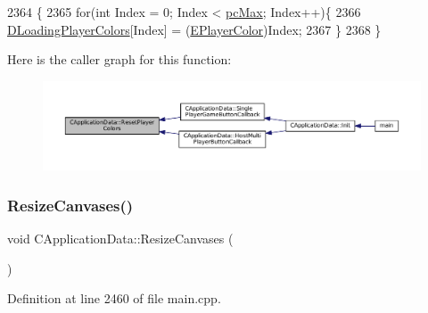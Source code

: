 \begin{DoxyCode}
2364                                         \{
2365     \textcolor{keywordflow}{for}(\textcolor{keywordtype}{int} Index = 0; Index < \hyperlink{GameDataTypes_8h_aafb0ca75933357ff28a6d7efbdd7602fa594a5c8dd3987f24e8a0f23f1a72cd34}{pcMax}; Index++)\{
2366         \hyperlink{classCApplicationData_ab29b80d90f1201608dcb498cd627a6f9}{DLoadingPlayerColors}[Index] = (\hyperlink{GameDataTypes_8h_aafb0ca75933357ff28a6d7efbdd7602f}{EPlayerColor})Index;
2367     \}
2368 \}
\end{DoxyCode}
Here is the caller graph for this function\+:
\nopagebreak
\begin{figure}[H]
\begin{center}
\leavevmode
\includegraphics[width=350pt]{classCApplicationData_a46653e8a3ed079f3921ec0257e49eb89_icgraph}
\end{center}
\end{figure}
\hypertarget{classCApplicationData_ad8b16ccb099b4996ce9fee34a407c091}{}\label{classCApplicationData_ad8b16ccb099b4996ce9fee34a407c091} 
\subsubsection{\texorpdfstring{Resize\+Canvases()}{ResizeCanvases()}}
{\footnotesize\ttfamily void C\+Application\+Data\+::\+Resize\+Canvases (\begin{DoxyParamCaption}{ }\end{DoxyParamCaption})\hspace{0.3cm}{\ttfamily [protected]}}



Definition at line 2460 of file main.\+cpp.


